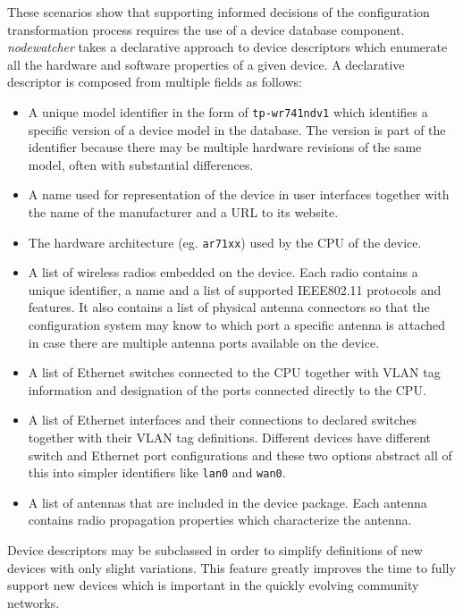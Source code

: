 \documentclass[5p,sort&compress]{elsarticle}
\newcommand{\nodewatcher}{\textit{nodewatcher}}
\begin{document}
These scenarios show that supporting informed decisions of the configuration transformation process requires the use of a device database component.
\nodewatcher{} takes a declarative approach to device descriptors which enumerate all the hardware and software properties of a given device.
A declarative descriptor is composed from multiple fields as follows:
\begin{itemize}
\item A unique model identifier in the form of \texttt{tp-wr741ndv1} which identifies a specific version of a device model in the database. The version is part of the identifier because there may be multiple hardware revisions of the same model, often with substantial differences.

\item A name used for representation of the device in user interfaces together with the name of the manufacturer and a URL to its website.

\item The hardware architecture (eg. \texttt{ar71xx}) used by the CPU of the device.

\item A list of wireless radios embedded on the device.
Each radio contains a unique identifier, a name and a list of supported IEEE802.11 protocols and features.
It also contains a list of physical antenna connectors so that the configuration system may know to which port a specific antenna is attached in case there are multiple antenna ports available on the device.

\item A list of Ethernet switches connected to the CPU together with VLAN tag information and designation of the ports connected directly to the CPU.

\item A list of Ethernet interfaces and their connections to declared switches together with their VLAN tag definitions. 
Different devices have different switch and Ethernet port configurations and these two options abstract all of this into simpler identifiers like \texttt{lan0} and \texttt{wan0}.

\item A list of antennas that are included in the device package.
Each antenna contains radio propagation properties which characterize the antenna.
\end{itemize}

Device descriptors may be subclassed in order to simplify definitions of new devices with only slight variations.
This feature greatly improves the time to fully support new devices which is important in the quickly evolving community networks.
\end{document}
